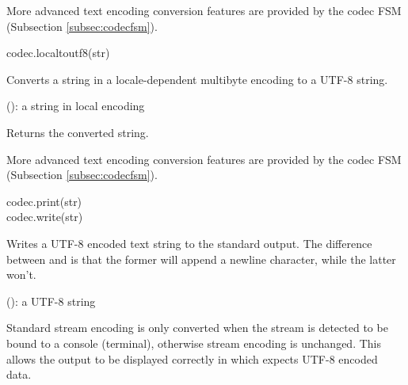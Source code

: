 \documentclass[a4paper,12pt,twoside,extrafontsizes]{memoir}
\begin{document}
\begin{funcremarks}
	More advanced text encoding conversion features are provided by the codec FSM (Subsection \ref{subsec:codecfsm}).
\end{funcremarks}


\begin{luafuncprototype}
codec.localtoutf8(str)
\end{luafuncprototype}

\begin{funcdescr}
	Converts a string in a locale-dependent multibyte encoding to a UTF-8 string.
\end{funcdescr}

\begin{funcparams}
	 (): a string in local encoding
\end{funcparams}

\begin{funcret}
	Returns the converted string.
\end{funcret}

\begin{funcremarks}
	More advanced text encoding conversion features are provided by the codec FSM (Subsection \ref{subsec:codecfsm}).
\end{funcremarks}


\begin{luafuncprototype}
codec.print(str) \\
codec.write(str)
\end{luafuncprototype}

\begin{funcdescr}
	Writes a UTF-8 encoded text string to the standard output. The difference between  and  is that the former will append a newline character, while the latter won't.
\end{funcdescr}

\begin{funcparams}
	 (): a UTF-8 string
\end{funcparams}

\begin{funcremarks}
	Standard stream encoding is only converted when the stream is detected to be bound to a console (terminal), otherwise stream encoding is unchanged. This allows the output to be displayed correctly in  which expects UTF-8 encoded data.
\end{funcremarks}
\end{document}
